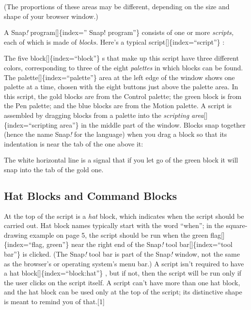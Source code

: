 \documentclass[
  letterpaper,
]{book}
\begin{document}
(The proportions of these areas may be different, depending on the size
and shape of your browser window.)

A Snap\emph{!} program{[}{]}\{index='' Snap! program''\} consists of one
or more \emph{scripts,} each of which is made of \emph{blocks.} Here's a
typical script{[}{]}\{index=``script''\} :

The five block{[}{]}\{index=``block''\} s that make up this script have
three different colors, corresponding to three of the eight
\emph{palettes} in which blocks can be found. The
palette{[}{]}\{index=``palette''\} area at the left edge of the window
shows one palette at a time, chosen with the eight buttons just above
the palette area. In this script, the gold blocks are from the Control
palette; the green block is from the Pen palette; and the blue blocks
are from the Motion palette. A script is assembled by dragging blocks
from a palette into the \emph{scripting area}{[}{]}\{index=``scripting
area''\} in the middle part of the window. Blocks snap together (hence
the name Snap\emph{!} for the language) when you drag a block so that
its indentation is near the tab of the one above it:

The white horizontal line is a signal that if you let go of the green
block it will snap into the tab of the gold one.

\subsection{Hat Blocks and Command
Blocks}\label{hat-blocks-and-command-blocks}

At the top of the script is a \emph{hat} block, which indicates when the
script should be carried out. Hat block names typically start with the
word ``when''; in the square-drawing example on page 5, the script
should be run when the green flag{[}{]}\{index=``flag, green''\} near
the right end of the Snap\emph{!} tool bar{[}{]}\{index=``tool bar''\}
is clicked. (The Snap\emph{!} tool bar is part of the Snap\emph{!}
window, not the same as the browser's or operating system's menu bar.) A
script isn't required to have a hat block{[}{]}\{index=``block:hat''\} ,
but if not, then the script will be run only if the user clicks on the
script itself. A script can't have more than one hat block, and the hat
block can be used only at the top of the script; its distinctive shape
is meant to remind you of
that.{[}1{]}\label{generic_when}{}
\end{document}
